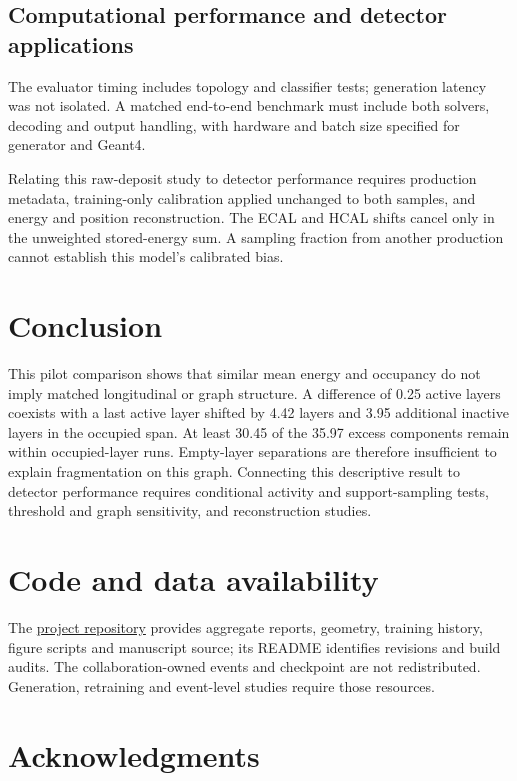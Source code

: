 \documentclass[11pt]{article}
\begin{document}
\subsection{Computational performance and detector applications}

The evaluator timing includes topology and classifier tests; generation latency was not isolated. A matched end-to-end benchmark must include both solvers, decoding and output handling, with hardware and batch size specified for generator and Geant4.

Relating this raw-deposit study to detector performance requires production metadata, training-only calibration applied unchanged to both samples, and energy and position reconstruction. The ECAL and HCAL shifts cancel only in the unweighted stored-energy sum. A sampling fraction from another production cannot establish this model's calibrated bias.

\section{Conclusion}

This pilot comparison shows that similar mean energy and occupancy do not imply matched longitudinal or graph structure. A difference of 0.25 active layers coexists with a last active layer shifted by 4.42 layers and 3.95 additional inactive layers in the occupied span. At least 30.45 of the 35.97 excess components remain within occupied-layer runs. Empty-layer separations are therefore insufficient to explain fragmentation on this graph. Connecting this descriptive result to detector performance requires conditional activity and support-sampling tests, threshold and graph sensitivity, and reconstruction studies.

\section*{Code and data availability}

The \href{https://github.com/JulianAttemptsCoding/fast-mc-paper}{project repository} provides aggregate reports, geometry, training history, figure scripts and manuscript source; its README identifies revisions and build audits. The collaboration-owned events and checkpoint are not redistributed. Generation, retraining and event-level studies require those resources.

\section*{Acknowledgments}
\end{document}
